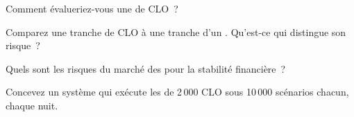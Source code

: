 \begin{interviewq}\label{iq:m2:loans-clos-and-securitisation:3}
Comment évalueriez-vous une  de CLO~?
\end{interviewq}

\begin{interviewq}\label{iq:m2:loans-clos-and-securitisation:4}
Comparez une tranche de CLO à une tranche d'un . Qu'est-ce qui
distingue son risque~?
\end{interviewq}

\begin{interviewq}\label{iq:m2:loans-clos-and-securitisation:5}
Quels sont les risques du marché des  pour la stabilité financière~?
\end{interviewq}

\begin{interviewq}\label{iq:m2:loans-clos-and-securitisation:6}
Concevez un système qui exécute les  de 2\,000 CLO sous 10\,000
scénarios chacun, chaque nuit.
\end{interviewq}
